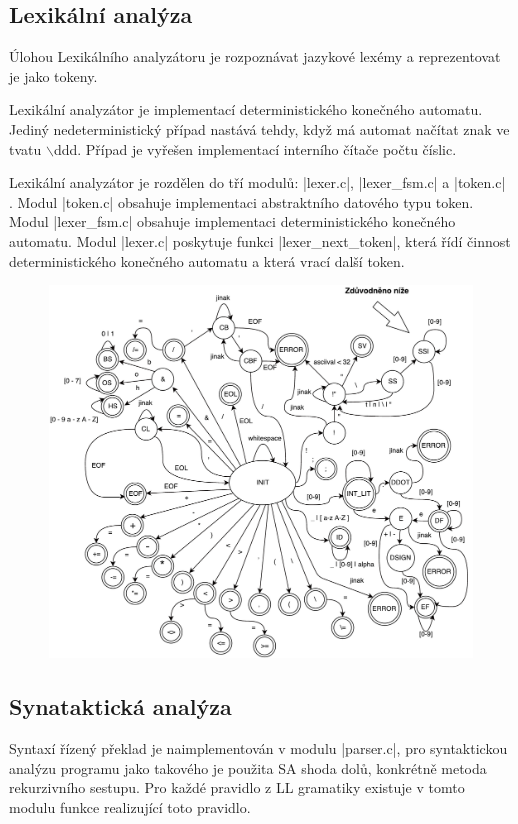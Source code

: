 \subsection{Lexikální analýza}
\label{subsec:lexer}
Úlohou Lexikálního analyzátoru je rozpoznávat jazykové lexémy a reprezentovat
je jako tokeny.

Lexikální analyzátor je implementací deterministického konečného
automatu. Jediný nedeterministický případ nastává tehdy, když má automat načítat znak ve tvatu $\backslash$ddd.
Případ je vyřešen implementací interního čítače počtu číslic.

Lexikální analyzátor je rozdělen do tří modulů: \ic|lexer.c|, \ic|lexer_fsm.c| a \ic|token.c|
. Modul \ic|token.c| obsahuje implementaci abstraktního datového typu token. Modul \ic|lexer_fsm.c|
obsahuje implementaci deterministického konečného automatu. Modul \ic|lexer.c| poskytuje funkci
\ic|lexer_next_token|, která řídí činnost deterministického konečného automatu a
která vrací další token.

\vspace*{16px}
\begin{figure}[htbp]
    \centering
    \includegraphics[width=1\textwidth, angle=0]{src/assets/automat.pdf}
\end{figure}

\subsection{Synataktická analýza}
Syntaxí řízený překlad je naimplementován v modulu \ic|parser.c|, pro syntaktickou analýzu programu jako takového je
použita SA shoda dolů, konkrétně metoda rekurzivního sestupu. Pro každé pravidlo z LL gramatiky existuje v tomto
modulu funkce realizující toto pravidlo.

